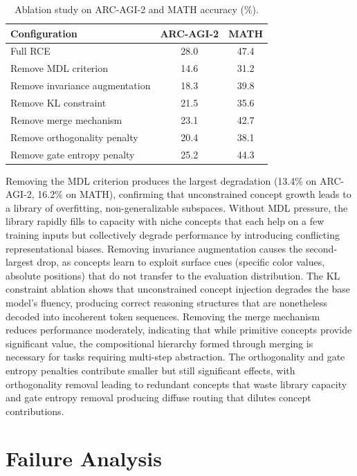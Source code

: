 \documentclass[11pt]{article}
\begin{document}
\begin{table}[t]
\centering
\caption{Ablation study on ARC-AGI-2 and MATH accuracy (\%).}
\label{tab:ablation}
\small
\begin{tabular}{lcc}
\toprule
Configuration & ARC-AGI-2 & MATH \\
\midrule
Full RCE & 28.0 & 47.4 \\
Remove MDL criterion & 14.6 & 31.2 \\
Remove invariance augmentation & 18.3 & 39.8 \\
Remove KL constraint & 21.5 & 35.6 \\
Remove merge mechanism & 23.1 & 42.7 \\
Remove orthogonality penalty & 20.4 & 38.1 \\
Remove gate entropy penalty & 25.2 & 44.3 \\
\bottomrule
\end{tabular}
\end{table}

Removing the MDL criterion produces the largest degradation (13.4\% on ARC-AGI-2, 16.2\% on MATH), confirming that unconstrained concept growth leads to a library of overfitting, non-generalizable subspaces. Without MDL pressure, the library rapidly fills to capacity with niche concepts that each help on a few training inputs but collectively degrade performance by introducing conflicting representational biases. Removing invariance augmentation causes the second-largest drop, as concepts learn to exploit surface cues (specific color values, absolute positions) that do not transfer to the evaluation distribution. The KL constraint ablation shows that unconstrained concept injection degrades the base model's fluency, producing correct reasoning structures that are nonetheless decoded into incoherent token sequences. Removing the merge mechanism reduces performance moderately, indicating that while primitive concepts provide significant value, the compositional hierarchy formed through merging is necessary for tasks requiring multi-step abstraction. The orthogonality and gate entropy penalties contribute smaller but still significant effects, with orthogonality removal leading to redundant concepts that waste library capacity and gate entropy removal producing diffuse routing that dilutes concept contributions.

\section{Failure Analysis}
\end{document}
